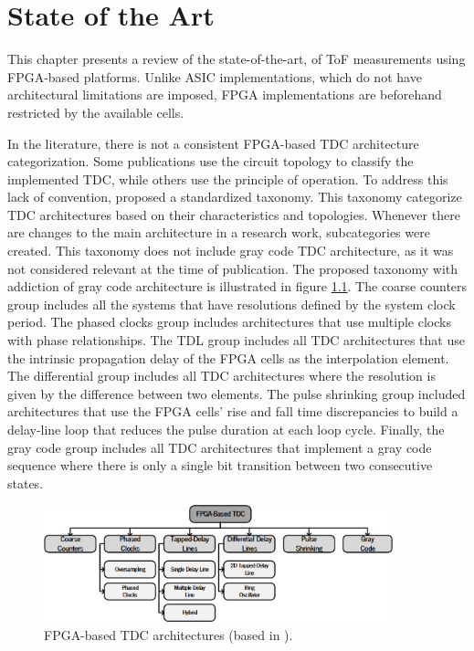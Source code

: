 
\chapter{State of the Art} %
\label{cha:state_of_the_art}


This chapter presents a review of the state-of-the-art, of \gls{ToF} measurements using \gls{FPGA}-based platforms. Unlike \gls{ASIC} implementations, which do not have architectural limitations are imposed, \gls{FPGA} implementations are beforehand restricted by the available cells.

In the literature, there is not a consistent \gls{FPGA}-based \gls{TDC} architecture categorization. Some publications use the circuit topology to classify the implemented \gls{TDC}, while others use the principle of operation. To address this lack of convention, \citet{machado_ov} proposed a standardized taxonomy. This taxonomy categorize \gls{TDC} architectures based on their characteristics and topologies. Whenever there are changes to the main architecture in a research work, subcategories were created. This taxonomy does not include gray code \gls{TDC} architecture, as it was not considered relevant at the time of publication. The proposed taxonomy with addiction of gray code architecture is illustrated in figure \ref{fig:taxonomy}. The coarse counters group includes all the systems that have resolutions defined by the system clock period. The phased clocks group includes architectures that use multiple clocks with phase relationships. The \gls{TDL} group includes all \gls{TDC} architectures that use the intrinsic propagation delay of the \gls{FPGA} cells as the interpolation element. The differential group includes all \gls{TDC} architectures where the resolution is given by the difference between two elements. The pulse shrinking group included architectures that use the \gls{FPGA} cells' rise and fall time discrepancies to build a delay-line loop that reduces the pulse duration at each loop cycle. Finally, the gray code group includes all \gls{TDC} architectures that implement a gray code sequence where there is only a single bit transition between two consecutive states.

\begin{figure}[H]
	\centering
	\includegraphics[width=0.9\textwidth]{img/02_StateofArt/taxonomy.png}
	\caption{FPGA-based TDC architectures (based in \citep{machado_ov}).}
	\label{fig:taxonomy}
\end{figure}


